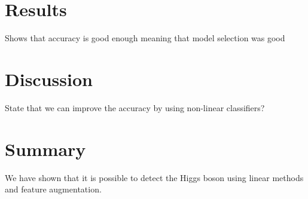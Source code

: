 \documentclass[10pt,conference,compsocconf]{IEEEtran}
\begin{document}
\section{Results}
Shows that accuracy is good enough meaning that model selection was good
\section{Discussion}
State that we can improve the accuracy by using non-linear classifiers?
\section{Summary}
We have shown that it is possible to detect the Higgs boson using linear methods and feature augmentation.
\end{document}
